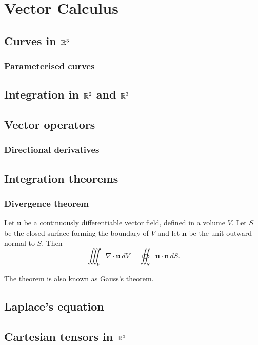 \documentclass[main.tex]{subfiles}
\begin{document}
	\chapter{Vector Calculus}
		\section{Curves in $\mathbb R^3$}
		\subsection{Parameterised curves}
		
		\section{Integration in $\mathbb R^2$ and $\mathbb R^3$}
		
		\section{Vector operators}
		\subsection{Directional derivatives}
		
		\section{Integration theorems}
		\subsection{Divergence theorem}
		\begin{theorem}
			Let $\mathbf{u}$ be a continuously differentiable vector field, defined in a volume $V$. Let $S$ be the closed surface forming the boundary of $V$ and let $\mathbf{n}$ be the unit outward normal to $S$. Then
			\begin{equation*}
				\iiint_V \nabla \cdot \mathbf{u}\, dV = \oiint_S \mathbf{u}\cdot \mathbf n\, dS.
			\end{equation*}
		\end{theorem}
		The theorem is also known as Gauss's theorem.
		\section{Laplace's equation}
		
		\section{Cartesian tensors in $\mathbb R^3$}
\end{document}
